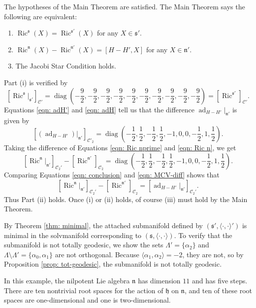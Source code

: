 \documentclass[12pt]{amsart}
\newcommand{\la}{\langle}
\newcommand{\ra}{\rangle}
\newcommand{\smallfrac}[2]{\textstyle{\frac{#1}{#2}}  }
\newcommand{\calC}{\ensuremath{\mathcal{C}} }
\newcommand{\frakh}{\ensuremath{\mathfrak{h}} }
\newcommand{\frakn}{\ensuremath{\mathfrak{n}} }
\newcommand{\fraks}{\ensuremath{\mathfrak{s}} }
\newcommand\n{{\mathfrak{n}}}
\newcommand\s{{\mathfrak{s}}}
\newcommand\ip{{\langle\cdot {,} \cdot\rangle}}
\newcommand\diag{\operatorname{diag}}
\newcommand\ad{\operatorname{ad}}
\newcommand{\Ric}{\operatorname{Ric}}
\theoremstyle{plain}
\theoremstyle{definition}
\theoremstyle{remark}
\numberwithin{equation}{section}
\numberwithin{theorem}{section}
\begin{document}
The hypotheses of the Main Theorem are satisfied. 
The Main Theorem says the following are equivalent:
   \begin{enumerate}
       \item 
 ${\displaystyle \Ric^{\s}(X) = \Ric^{\s'}(X)}$   for any $X \in \s'$.
\item $\Ric^\n (X) - \Ric^{\n'} (X) =  [H - H', X]$ for any $X \in \n'$.
  \item The Jacobi Star Condition  holds. 
\end{enumerate}
 Part (i) is verified by
\[ [\Ric^\fraks|_{\fraks'}]_{\calC'} = 
\diag(-\smallfrac92,-\smallfrac92,-\smallfrac92,-\smallfrac92,-\smallfrac92,-\smallfrac92,-\smallfrac92,-\smallfrac92,-\smallfrac92,-\smallfrac92) = [\Ric^{\fraks'}]_{\calC'} .\]
Equations \eqref{eqn: adH'} and \eqref{eqn: adH}  tell us that
the difference $\ad_{H -H'}|_{\n'}$ is given by
\begin{equation}\label{eqn: MCV-diff}[(\ad_{H -H'})|_{\n'}]_{\calC'_2} = \diag\left(-\smallfrac12, \smallfrac12, -\smallfrac12, \smallfrac12, -1, 0, 0, -\smallfrac12, 1, \smallfrac12\right).
\end{equation}
Taking the difference of Equations \eqref{eqn: Ric nprime} and \eqref{eqn: Ric n}, we get
\begin{equation}\label{eqn: conclusion}[\Ric^\frakn|_{\frakn'}]_{\calC_2'} - [\Ric^{\frakn'}]_{\calC_2} 
= \diag\left(-\smallfrac 12, \smallfrac 12, -\smallfrac 12, \smallfrac 12, -1, 0, 0, -\smallfrac 12, 1, \smallfrac 12 \right).
\end{equation}
Comparing Equations \eqref{eqn: conclusion} and \eqref{eqn: MCV-diff} shows that 
\[ 
[\Ric^\frakn|_{\frakn'}]_{\calC_2'} - [\Ric^{\frakn'}]_{\calC_2} 
= [\ad_{H -H'}|_{\n'}]_{\calC_2'} .\]
Thus Part (ii) holds.    
Once (i) or (ii) holds, of course (iii) must hold by the Main Theorem.

By Theorem \ref{thm: minimal}, the attached submanifold defined by
$(\fraks', \ip')$ is minimal in the solvmanifold corresponding to 
$(\fraks, \ip)$.
To verify that the submanifold is not totally geodesic, we show the sets 
$\Lambda'=\{\alpha_2\}$ and $\Lambda \setminus \Lambda' = \{\alpha_0,
\alpha_1\}$ are not orthogonal.  Because $\la \alpha_1,\alpha_2\ra=-2$, they
are not, so by Proposition \ref{prop: tot-geodesic}, the submanifold is not
totally geodesic.

In this example, the nilpotent Lie algebra $\frakn$ has dimension $11$
and has five steps.   There are ten nontrivial root spaces for the action of  $\frakh$ on $\frakn$, and ten of these  
root  spaces are one-dimensional and one is two-dimensional.
\end{document}
